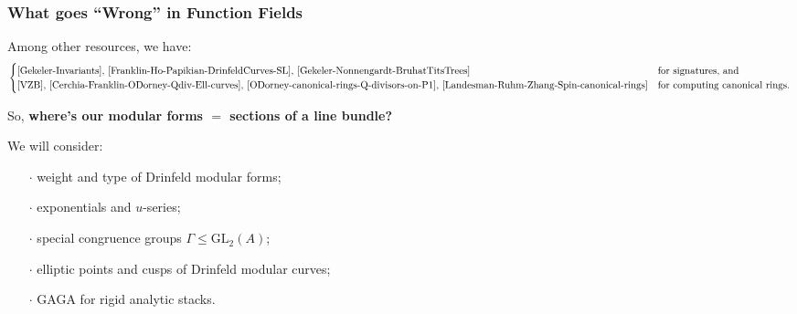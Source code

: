 \documentclass[handout]{beamer}
\numberwithin{equation}{section}
\numberwithin{case}{theorem}
\newcommand{\GL}{\mathrm{GL}} 	%
\newcommand{\<}{\left\langle}
\renewcommand{\>}{\right\rangle}
\begin{document}
	\begin{frame}
		\frametitle{What goes ``Wrong'' in Function Fields}		
		Among other resources, we have: 
		\[\begin{cases}
			\text{\cite{Gekeler-Invariants}, \cite{Franklin-Ho-Papikian-DrinfeldCurves-SL}, \cite{Gekeler-Nonnengardt-BruhatTitsTrees}} & \text{for signatures, and}\\
			\text{\cite{VZB}, \cite{Cerchia-Franklin-ODorney-Qdiv-Ell-curves}, \cite{ODorney-canonical-rings-Q-divisors-on-P1}, \cite{Landesman-Ruhm-Zhang-Spin-canonical-rings}} & \text{for computing canonical rings.}
		\end{cases}
		\]
		
		\pause 
		So, \textbf{where's our modular forms $=$ sections of a line bundle?} \pause 
		
		We will consider:
		\begin{itemize}
			\item[$\cdot$] weight and type of Drinfeld modular forms; \pause
			\item[$\cdot$] exponentials and $u$-series; \pause
			\item[$\cdot$] special congruence groups $\Gamma\leq \GL_2(A)$; \pause
			\item[$\cdot$] elliptic points and cusps of Drinfeld modular curves; \pause
			\item[$\cdot$] GAGA for rigid analytic stacks.
		\end{itemize}
	\end{frame}	
	
\end{document}
